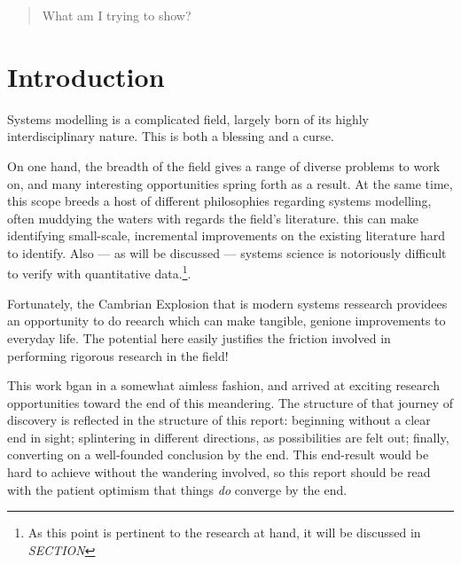 \documentclass[draft]{report}
\begin{document}
\maketitle

\begin{abstract}
  What am I trying to show?
\end{abstract}

\section{Introduction}
\label{sec:introduction}
Systems modelling is a
complicated field, largely born of its highly interdisciplinary nature. This is
both a blessing and a curse.\par


On one hand, the breadth of the field gives a range of diverse problems to work
on, and many interesting opportunities spring forth as a result. At the same
time, this scope breeds a host of different philosophies regarding systems
modelling, often muddying the waters with regards the field's literature. this
can make identifying small-scale, incremental improvements on the existing
literature hard to identify. Also --- as will be discussed --- systems science
is notoriously difficult to verify with quantitative data.\footnote{As this
  point is pertinent to the research at hand, it will be discussed in
  \emph{SECTION}}.\par

Fortunately, the Cambrian Explosion that is modern systems ressearch providees
an opportunity to do reearch which can make tangible, genione improvements to
everyday life. The potential here easily justifies the friction involved in
performing rigorous research in the field!\par

This work bgan in a somewhat aimless fashion, and arrived at exciting research
opportunities toward the end of this meandering. The structure of that journey
of discovery is reflected in the structure of this report: beginning without a
clear end in sight; splintering in different directions, as possibilities are
felt out; finally, converting on a well-founded conclusion by the end. This
end-result would be hard to achieve without the wandering involved, so this
report should be read with the patient optimism that things \emph{do} converge
by the end.\par
\end{document}
